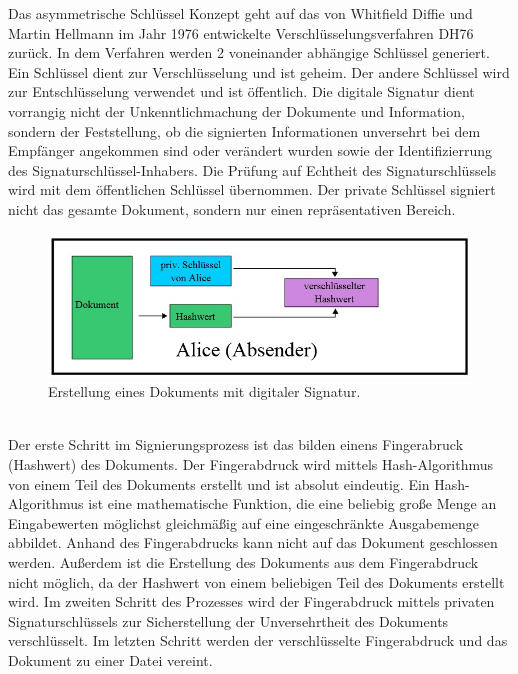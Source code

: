 Das asymmetrische Schlüssel Konzept geht auf das von Whitfield Diffie und Martin Hellmann im Jahr 1976 entwickelte Verschlüsselungsverfahren DH76 zurück. In dem Verfahren werden 2 voneinander abhängige Schlüssel generiert. Ein Schlüssel dient zur Verschlüsselung und ist geheim. Der andere Schlüssel wird zur Entschlüsselung verwendet und ist öffentlich. Die digitale Signatur dient vorrangig nicht der Unkenntlichmachung der Dokumente und Information, sondern der Feststellung, ob die signierten Informationen unversehrt bei dem Empfänger angekommen sind oder verändert wurden sowie der Identifizierrung des Signaturschlüssel-Inhabers. Die Prüfung auf Echtheit des Signaturschlüssels wird mit dem öffentlichen Schlüssel übernommen. Der private Schlüssel signiert nicht das gesamte Dokument, sondern nur einen repräsentativen Bereich. \cite{techno1}
\begin{figure}[!ht]
    \centering
    \includegraphics[width=\textwidth]{ErstellungAbsender2.jpg}
    \caption[Erstellung eines Dokuments mit digitaler Signatur]{Erstellung eines Dokuments mit digitaler Signatur. \cite{techno3}}
    \label{fig:2}
\end{figure}\\
Der erste Schritt im Signierungsprozess ist das bilden einens Fingerabruck (Hashwert) des Dokuments. Der Fingerabdruck wird mittels Hash-Algorithmus von einem Teil des Dokuments erstellt und ist absolut eindeutig. Ein Hash-Algorithmus ist eine mathematische Funktion, die eine beliebig große Menge an Eingabewerten möglichst gleichmäßig auf eine eingeschränkte Ausgabemenge abbildet. \cite{techno2} Anhand des Fingerabdrucks kann nicht auf das Dokument geschlossen werden. Außerdem ist die Erstellung des Dokuments aus dem Fingerabdruck nicht möglich, da der Hashwert von einem beliebigen Teil des Dokuments erstellt wird. Im zweiten Schritt des Prozesses wird der Fingerabdruck mittels privaten Signaturschlüssels zur Sicherstellung der Unversehrtheit des Dokuments verschlüsselt. Im letzten Schritt werden der verschlüsselte Fingerabdruck und das Dokument zu einer Datei vereint. \cite{techno1}   